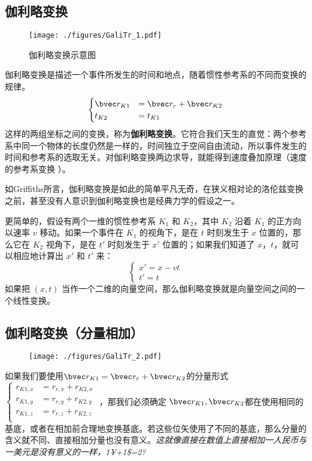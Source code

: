 

\subsection{伽利略变换}
\begin{figure}[ht]
\centering
\texttt{[image: ./figures/GaliTr\_1.pdf]}
\caption{伽利略变换示意图} \label{GaliTr_fig1}
\end{figure}

伽利略变换是描述一个事件所发生的时间和地点，随着惯性参考系的不同而变换的规律。
\begin{equation}
\begin{cases}
\bvec r_{K1} &= \bvec r_{r}+\bvec r_{K2}\\
t_{K2}&=t_{K1}
\end{cases}
\end{equation}
这样的两组坐标之间的变换，称为\textbf{伽利略变换}。它符合我们天生的直觉：两个参考系中同一个物体的长度仍然是一样的，时间独立于空间自由流动，所以事件发生的时间和参考系的选取无关。对伽利略变换两边求导，就能得到速度叠加原理（速度的参考系变换 ）。

如Griffiths所言，伽利略变换是如此的简单平凡无奇，在狭义相对论的洛伦兹变换之前，甚至没有人意识到伽利略变换也是经典力学的假设之一。

更简单的，假设有两个一维的惯性参考系 $K_1$ 和 $K_2$，其中 $K_2$ 沿着 $K_1$ 的正方向以速率 $v$ 移动。如果一个事件在 $K_1$ 的视角下，是在 $t$ 时刻发生于 $x$ 位置的，那么它在 $K_2$ 视角下，是在 $t'$ 时刻发生于 $x'$ 位置的；如果我们知道了 $x$，$t$，就可以相应地计算出 $x'$ 和 $t'$ 来：
\begin{equation}
\begin{cases}
x' = x - vt\\
t' = t
\end{cases}
\end{equation}
如果把 $(x, t)$ 当作一个二维的向量空间，那么伽利略变换就是向量空间之间的一个线性变换。

\subsection{伽利略变换（分量相加）}
\begin{figure}[ht]
\centering
\texttt{[image: ./figures/GaliTr\_2.pdf]}
\caption{} \label{GaliTr_fig2}
\end{figure}

如果我们要使用$\bvec r_{K1} = \bvec r_{r}+\bvec r_{K2}$的分量形式 
$
\begin{cases}
r_{K1,x}&=r_{r,x}+r_{K2,x}\\
r_{K1,y}&=r_{r,y}+r_{K2,y}\\
r_{K1,z}&=r_{r,z}+r_{K2,z}\\
\end{cases}
$
，那我们必须确定 $\bvec r_{K1}, \bvec r_{K2}$都在使用相同的基底，或者在相加前合理地变换基底。若这些位矢使用了不同的基底，那么分量的含义就不同、直接相加分量也没有意义。\textsl{这就像直接在数值上直接相加一人民币与一美元是没有意义的一样，1¥+1\$=2?}
